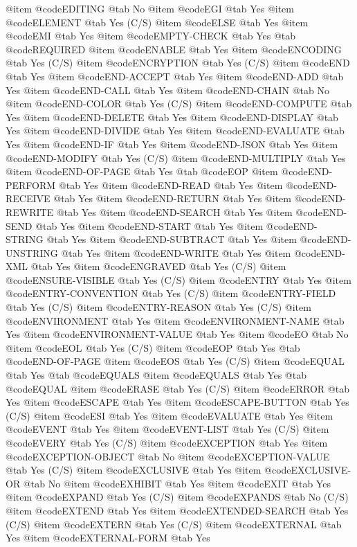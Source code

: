 @item @code{EDITING} @tab No
@item @code{EGI} @tab Yes
@item @code{ELEMENT} @tab Yes (C/S)
@item @code{ELSE} @tab Yes
@item @code{EMI} @tab Yes
@item @code{EMPTY-CHECK} @tab Yes @tab @code{REQUIRED}
@item @code{ENABLE} @tab Yes
@item @code{ENCODING} @tab Yes (C/S)
@item @code{ENCRYPTION} @tab Yes (C/S)
@item @code{END} @tab Yes
@item @code{END-ACCEPT} @tab Yes
@item @code{END-ADD} @tab Yes
@item @code{END-CALL} @tab Yes
@item @code{END-CHAIN} @tab No
@item @code{END-COLOR} @tab Yes (C/S)
@item @code{END-COMPUTE} @tab Yes
@item @code{END-DELETE} @tab Yes
@item @code{END-DISPLAY} @tab Yes
@item @code{END-DIVIDE} @tab Yes
@item @code{END-EVALUATE} @tab Yes
@item @code{END-IF} @tab Yes
@item @code{END-JSON} @tab Yes
@item @code{END-MODIFY} @tab Yes (C/S)
@item @code{END-MULTIPLY} @tab Yes
@item @code{END-OF-PAGE} @tab Yes @tab @code{EOP}
@item @code{END-PERFORM} @tab Yes
@item @code{END-READ} @tab Yes
@item @code{END-RECEIVE} @tab Yes
@item @code{END-RETURN} @tab Yes
@item @code{END-REWRITE} @tab Yes
@item @code{END-SEARCH} @tab Yes
@item @code{END-SEND} @tab Yes
@item @code{END-START} @tab Yes
@item @code{END-STRING} @tab Yes
@item @code{END-SUBTRACT} @tab Yes
@item @code{END-UNSTRING} @tab Yes
@item @code{END-WRITE} @tab Yes
@item @code{END-XML} @tab Yes
@item @code{ENGRAVED} @tab Yes (C/S)
@item @code{ENSURE-VISIBLE} @tab Yes (C/S)
@item @code{ENTRY} @tab Yes
@item @code{ENTRY-CONVENTION} @tab Yes (C/S)
@item @code{ENTRY-FIELD} @tab Yes (C/S)
@item @code{ENTRY-REASON} @tab Yes (C/S)
@item @code{ENVIRONMENT} @tab Yes
@item @code{ENVIRONMENT-NAME} @tab Yes
@item @code{ENVIRONMENT-VALUE} @tab Yes
@item @code{EO} @tab No
@item @code{EOL} @tab Yes (C/S)
@item @code{EOP} @tab Yes @tab @code{END-OF-PAGE}
@item @code{EOS} @tab Yes (C/S)
@item @code{EQUAL} @tab Yes @tab @code{EQUALS}
@item @code{EQUALS} @tab Yes @tab @code{EQUAL}
@item @code{ERASE} @tab Yes (C/S)
@item @code{ERROR} @tab Yes
@item @code{ESCAPE} @tab Yes
@item @code{ESCAPE-BUTTON} @tab Yes (C/S)
@item @code{ESI} @tab Yes
@item @code{EVALUATE} @tab Yes
@item @code{EVENT} @tab Yes
@item @code{EVENT-LIST} @tab Yes (C/S)
@item @code{EVERY} @tab Yes (C/S)
@item @code{EXCEPTION} @tab Yes
@item @code{EXCEPTION-OBJECT} @tab No
@item @code{EXCEPTION-VALUE} @tab Yes (C/S)
@item @code{EXCLUSIVE} @tab Yes
@item @code{EXCLUSIVE-OR} @tab No
@item @code{EXHIBIT} @tab Yes
@item @code{EXIT} @tab Yes
@item @code{EXPAND} @tab Yes (C/S)
@item @code{EXPANDS} @tab No (C/S)
@item @code{EXTEND} @tab Yes
@item @code{EXTENDED-SEARCH} @tab Yes (C/S)
@item @code{EXTERN} @tab Yes (C/S)
@item @code{EXTERNAL} @tab Yes
@item @code{EXTERNAL-FORM} @tab Yes
